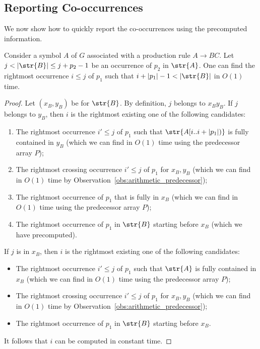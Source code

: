 \subsection{Reporting Co-occurrences}
We now show how to quickly report the co-occurrences using the precomputed information. 

\begin{proposition}\label{claim:predecessor_of_crossing}
Consider a symbol $A$ of $G$ associated with a production rule $A \rightarrow BC$. Let $j < |\str{B}| \le j+p_2-1$ be an occurrence of $p_2$ in $\str{A}$. One can find the rightmost occurrence $i \le j$ of $p_1$ such that $i+|p_1|-1 < |\str{B}|$ in $O(1)$ time.  
\end{proposition}
\begin{proof}
Let $(x_B, y_B)$ be  for $\str{B}$. By definition, $j$ belongs to $x_By_B$. If $j$ belongs to $y_B$, then $i$ is the rightmost existing one of the following candidates:
\begin{enumerate}
    \item The rightmost occurrence $i' \le j$ of $p_1$ such that $\str{A[i..i+|p_1|)}$ is fully contained in $y_B$ (which we can find in $O(1)$ time using the predecessor array $P$); 
    \item The rightmost crossing occurrence $i' \le j$ of $p_1$ for $x_B, y_B$ (which we can find in $O(1)$ time by Observation~\ref{obs:arithmetic_predecessor});
    \item The rightmost occurrence of $p_1$ that is fully in $x_B$ (which we can find in $O(1)$ time using the predecessor array $P$); 
    \item The rightmost occurrence of $p_1$ in $\str{B}$ starting before $x_B$ (which we have precomputed). 
\end{enumerate}
If $j$ is in $x_B$, then $i$ is the rightmost existing one of the following candidates:
     \begin{itemize}
         \item The rightmost occurrence $i' \le j$ of $p_1$ such that $\str{A}$ is fully contained in $x_B$ (which we can find in $O(1)$ time using the predecessor array $P$);
         \item The rightmost crossing occurrence $i' \le j$ of $p_1$ for $x_B, y_B$ (which we can find in $O(1)$ time by Observation~\ref{obs:arithmetic_predecessor});
         \item The rightmost occurrence of $p_1$ in $\str{B}$ starting before $x_B$. 
     \end{itemize}
It follows that $i$ can be computed in constant time.
 
\end{proof}

